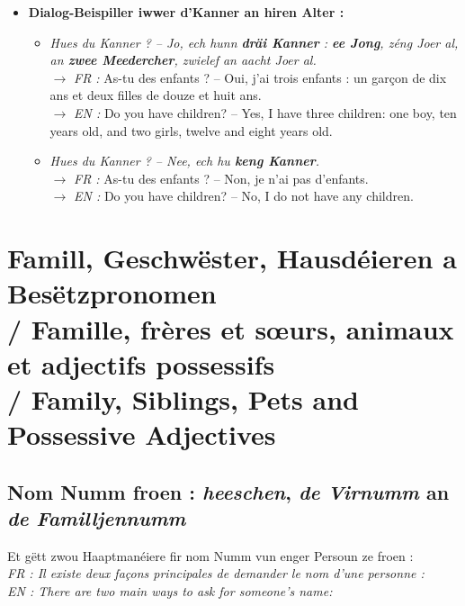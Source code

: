 \begin{itemize}
    \item \textbf{Dialog-Beispiller iwwer d'Kanner an hiren Alter :}
    \begin{itemize}
        \item \textit{Hues du Kanner ? -- Jo, ech hunn \textbf{dräi Kanner} : \textbf{ee Jong}, zéng Joer al, an \textbf{zwee Meedercher}, zwielef an aacht Joer al.} \\
        $\rightarrow$ \textit{FR :} As-tu des enfants ? -- Oui, j'ai trois enfants : un garçon de dix ans et deux filles de douze et huit ans. \\
        $\rightarrow$ \textit{EN :} Do you have children? -- Yes, I have three children: one boy, ten years old, and two girls, twelve and eight years old.
        \item \textit{Hues du Kanner ? -- Nee, ech hu \textbf{keng Kanner}.} \\
        $\rightarrow$ \textit{FR :} As-tu des enfants ? -- Non, je n'ai pas d'enfants. \\
        $\rightarrow$ \textit{EN :} Do you have children? -- No, I do not have any children.
    \end{itemize}
\end{itemize}

\vspace{1.5em}

\section[Famill, Geschwëster a Besëtzpronomen]{Famill, Geschwëster, Hausdéieren a Besëtzpronomen \\/ Famille, frères et sœurs, animaux et adjectifs possessifs \\/ Family, Siblings, Pets and Possessive Adjectives}

\subsection{Nom Numm froen : \textit{heeschen}, \textit{de Virnumm} an \textit{de Familljennumm}}

Et gëtt zwou Haaptmanéiere fir nom Numm vun enger Persoun ze froen : \\
\textit{FR : Il existe deux façons principales de demander le nom d'une personne :} \\
\textit{EN : There are two main ways to ask for someone's name:}

